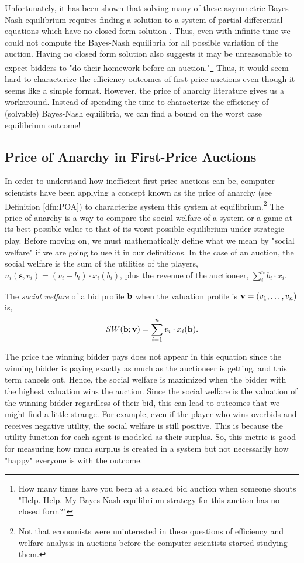 \documentclass[12pt,twoside]{reedthesis}
\begin{document}
 Unfortunately, it has been shown that solving many of these asymmetric Bayes-Nash equilibrium requires finding a solution to a system of partial differential equations which have no closed-form solution \citep{Roughgarden2017}. Thus, even with infinite time we could not compute the Bayes-Nash equilibria for all possible variation of the auction. Having no closed form solution also suggests it may be unreasonable to expect bidders to "do their homework before an auction."\footnote{How many times have you been at a sealed bid auction when someone shouts "Help. Help. My Bayes-Nash equilibrium strategy for this auction has no closed form?"} Thus, it would seem hard to characterize the efficiency outcomes of first-price auctions even though it seems like a simple format. However, the price of anarchy literature gives us a workaround. Instead of spending the time to characterize the efficiency of (solvable) Bayes-Nash equilibria, we can find a bound on the worst case equilibrium outcome!
\label{sec:knownBayes}
\subsection{Price of Anarchy in First-Price Auctions} 
In order to understand how inefficient first-price auctions can be, computer scientists have been applying a concept known as the price of anarchy (see Definition \ref{dfn:POA}) to characterize system this system at equilibrium.\footnote{Not that economists were uninterested in these questions of efficiency and welfare analysis in auctions before the computer scientists started studying them.} The price of anarchy is a way to compare the social welfare of a system or a game at its best possible value to that of its worst possible equilibrium under strategic play. Before moving on, we must mathematically define what we mean by "social welfare" if we are going to use it in our definitions. In the case of an auction, the social welfare is the sum of the utilities of the players, $u_i(\textbf{s}, v_i) = (v_i - b_i) \cdot x_i(b_i)$, plus the revenue of the auctioneer, $\sum_{i}^{n} b_i \cdot x_i$. 

\begin{dfn}
	The \textit{social welfare} of a bid profile $\textbf{b}$ when the valuation profile is $\textbf{v} = (v_1, \ldots, v_n)$ is, 
	$$ SW(\textbf{b};\textbf{v}) = \sum_{i=1}^{n} v_i \cdot x_i (\textbf{b}).$$
	\label{dfn:SocialWelfare}
\end{dfn}

The price the winning bidder pays does not appear in this equation since the winning bidder is paying exactly as much as the auctioneer is getting, and this term cancels out. Hence, the social welfare is maximized when the bidder with the highest valuation wins the auction. Since the social welfare is the valuation of the winning bidder regardless of their bid, this can lead to outcomes that we might find a little strange. For example, even if the player who wins overbids and receives negative utility, the social welfare is still positive. This is because the utility function for each agent is modeled as their surplus. So, this metric is good for measuring how much surplus is created in a system but not necessarily how "happy" everyone is with the outcome. 
\end{document}
